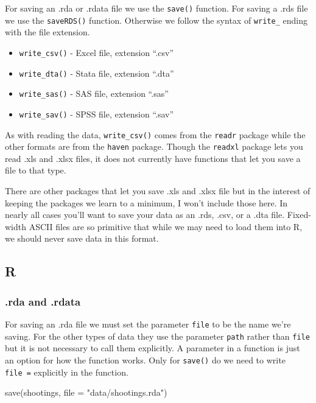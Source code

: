 \documentclass[
  a4paper,
]{krantz}
\makeatletter
\newenvironment{Shaded}{\begin{snugshade}}{\end{snugshade}}
\newcommand{\AttributeTok}[1]{\textcolor[rgb]{0.61,0.61,0.61}{#1}}
\newcommand{\FunctionTok}[1]{\textcolor[rgb]{0,0,0}{#1}}
\newcommand{\NormalTok}[1]{#1}
\newcommand{\StringTok}[1]{\textcolor[rgb]{0.5,0.5,0.5}{#1}}
\providecommand{\tightlist}{%
  \setlength{\itemsep}{0pt}\setlength{\parskip}{0pt}}
\newenvironment{kframe}{%
\medskip{}
\setlength{\fboxsep}{.8em}
 \def\at@end@of@kframe{}%
 \ifinner\ifhmode%
  \def\at@end@of@kframe{\end{minipage}}%
  \begin{minipage}{\columnwidth}%
 \fi\fi%
 \def\FrameCommand##1{\hskip\@totalleftmargin \hskip-\fboxsep
 \colorbox{shadecolor}{##1}\hskip-\fboxsep
     \hskip-\linewidth \hskip-\@totalleftmargin \hskip\columnwidth}%
 \MakeFramed {\advance\hsize-\width
   \@totalleftmargin\z@ \linewidth\hsize
   \@setminipage}}%
 {\par\unskip\endMakeFramed%
 \at@end@of@kframe}
\renewenvironment{Shaded}{\begin{kframe}}{\end{kframe}}
\makeatother
\begin{document}
For saving an .rda or .rdata file we use the \texttt{save()}
function. For saving a .rds file we use the
\texttt{saveRDS()} function. Otherwise we follow the syntax
of \texttt{write\_} ending with the file extension.

\begin{itemize}
\tightlist
\item
  \texttt{write\_csv()} - Excel file, extension ``.csv''
\item
  \texttt{write\_dta()} - Stata file, extension ``.dta''
\item
  \texttt{write\_sas()} - SAS file, extension ``.sas''
\item
  \texttt{write\_sav()} - SPSS file, extension ``.sav''
\end{itemize}

As with reading the data, \texttt{write\_csv()} comes from
the \texttt{readr} package while the other formats are from
the \texttt{haven} package. Though the \texttt{readxl}
package lets you read .xls and .xlsx files, it does not
currently have functions that let you save a file to that
type.

There are other packages that let you save .xls and .xlsx
file but in the interest of keeping the packages we learn to
a minimum, I won't include those here. In nearly all cases
you'll want to save your data as an .rds, .csv, or a .dta
file. Fixed-width ASCII files are so primitive that while we
may need to load them into R, we should never save data in
this format.

\hypertarget{r-1}{%
\subsection{R}\label{r-1}}

\hypertarget{rda-and-.rdata}{%
\subsubsection{.rda and .rdata}\label{rda-and-.rdata}}

For saving an .rda file we must set the parameter
\texttt{file} to be the name we're saving. For the other
types of data they use the parameter \texttt{path} rather
than \texttt{file} but it is not necessary to call them
explicitly. A parameter in a function is just an option for
how the function works. Only for \texttt{save()} do we need
to write \texttt{file\ =} explicitly in the function.

\begin{Shaded}
\begin{Highlighting}[]
\FunctionTok{save}\NormalTok{(shootings, }\AttributeTok{file =} \StringTok{"data/shootings.rda"}\NormalTok{)}
\end{Highlighting}
\end{Shaded}
\end{document}

